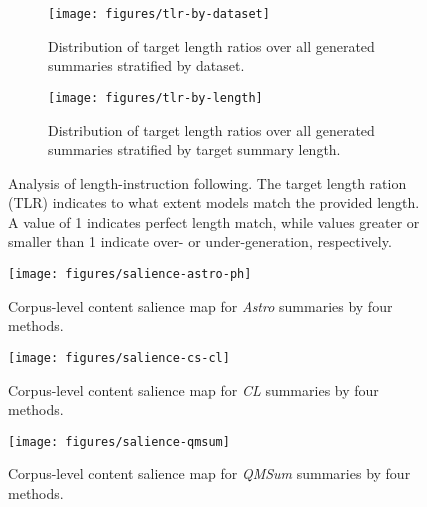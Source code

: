 

\begin{figure*}[t]
\centering
\begin{subfigure}[b]{\textwidth}
\texttt{[image: figures/tlr-by-dataset]}
\caption{Distribution of target length ratios over all generated summaries stratified by dataset.}
\label{fig:tlr-dataset}
\end{subfigure}
\vspace{0.5cm}
\begin{subfigure}[b]{\textwidth}
\texttt{[image: figures/tlr-by-length]}
\caption{Distribution of target length ratios over all generated summaries stratified by target summary length.}
\label{fig:tlr-length}
\end{subfigure}

\caption{Analysis of length-instruction following. The target length ration (TLR) indicates to what extent models match the provided length. A value of 1 indicates perfect length match, while values greater or smaller than 1 indicate over- or under-generation, respectively.}
\label{fig:tlr-stratified}
\end{figure*}


\begin{figure*}[t]
\texttt{[image: figures/salience-astro-ph]}
\caption{Corpus-level content salience map for \emph{Astro} summaries by four methods.}
\label{fig:salience-astro-ph}
\end{figure*}

\begin{figure*}[t]
\texttt{[image: figures/salience-cs-cl]}
\caption{Corpus-level content salience map for \emph{CL} summaries by four methods.}
\label{fig:salience-cs-cl}
\end{figure*}

\begin{figure*}[t]
\texttt{[image: figures/salience-qmsum]}
\caption{Corpus-level content salience map for \emph{QMSum} summaries by four methods.}
\label{fig:salience-qmsum}
\end{figure*}

